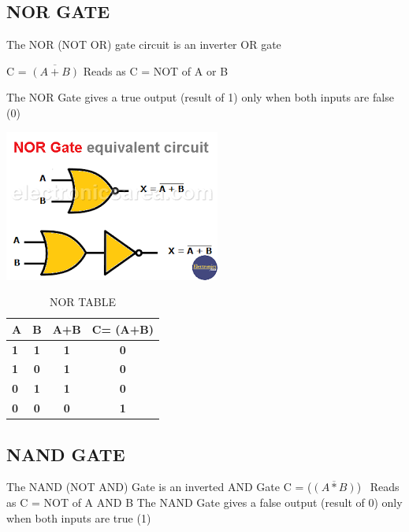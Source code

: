 \documentclass{article}
\begin{document}
\subsection{NOR GATE}
The NOR (NOT OR) gate circuit is an inverter OR gate

C =  $\overline{(A + B)}$
Reads as C = NOT of A or B
 
The NOR Gate gives a true output (result of 1) only when both inputs are false (0)

\includegraphics[width=0.6\linewidth]{nor}
\begin{table}[h!]
	\begin{center}
		\caption{NOR TABLE}
		\begin{tabular}{l|c|c|c|}
			\textbf{A} & \textbf{B} & \textbf{A+B} & \textbf{C= (A+B)} \\
			\hline
			\textbf{1} & \textbf{1} & \textbf{1} & \textbf{0} \\
			\textbf{1} & \textbf{0} & \textbf{1} & \textbf{0} \\
			\textbf{0} & \textbf{1} & \textbf{1} & \textbf{0} \\
			\textbf{0} & \textbf{0} & \textbf{0} & \textbf{1} \\
		\end{tabular}
	\end{center}
\end{table}
\newpage
\subsection{NAND GATE}
The NAND (NOT AND) Gate is an inverted AND Gate
C = ($\overline{(A * B)}$) 
Reads as C = NOT of A AND B
The NAND Gate gives a false output (result of 0) only when both inputs are true (1)
\end{document}
